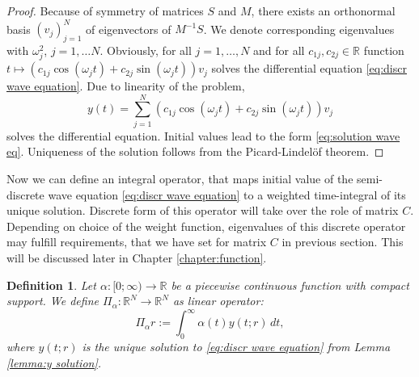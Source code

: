 \documentclass[a4paper,11pt,bibliography=totoc,listof=totoc,headinclude=true,cleardoublepage=empty,oneside]{scrbook}
\newtheorem{definition}[theorem]{Definition}
\newcommand{\R}{\mathbb{R}}
\begin{document}
\begin{proof}
    Because of symmetry of matrices $S$ and $M$, there exists an orthonormal basis $(v_j)_{j=1}^N$ of eigenvectors of $M^{-1}S$. We denote corresponding eigenvalues with $\omega_j^2$, $j=1, \dots N$. Obviously, for all $j=1, \dots, N$ and for all $c_{1j}, c_{2j}\in \R$ function $t\mapsto \left(c_{1j} \cos(\omega_j t) + c_{2j} \sin(\omega_j t)\right)v_j$ solves the differential equation \eqref{eq:discr wave equation}. Due to linearity of the problem, 
    \begin{equation*}
        y(t) = \sum_{j=1}^N \left(c_{1j} \cos(\omega_j t) + c_{2j} \sin(\omega_j t)\right)v_j
    \end{equation*}
    solves the differential equation. Initial values lead to the form \eqref{eq:solution wave eq}. Uniqueness of the solution follows from the Picard-Lindelöf theorem.
\end{proof}

Now we can define an integral operator, that maps initial value of the semi-discrete wave equation \eqref{eq:discr wave equation} to a weighted time-integral of its unique solution. Discrete form of this operator will take over the role of matrix $C$. Depending on choice of the weight function, eigenvalues of this discrete operator may fulfill requirements, that we have set for matrix $C$ in previous section. This will be discussed later in Chapter \ref{chapter:function}. 

\begin{definition}
    Let $\alpha: [0; \infty) \rightarrow \R$ be a piecewise continuous function with compact support. We define $\Pi_\alpha: \R^N \rightarrow \R^N$ as linear operator:
    \begin{equation*}
        \Pi_\alpha r := \int_0^\infty \alpha(t) y(t;r) \,dt,
    \end{equation*}
    where $y(t;r)$ is the unique solution to \eqref{eq:discr wave equation} from Lemma \ref{lemma:y solution}.
\end{definition}
\end{document}
